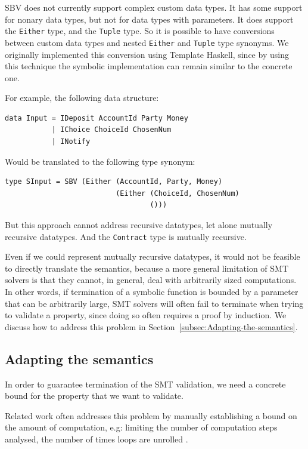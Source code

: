 \documentclass[english,runningheads]{llncs}
\begin{document}
SBV does not currently support complex custom data types. It has some
support for nonary data types, but not for data types with parameters.
It does support the \texttt{Either} type, and the \texttt{Tuple} type.
So it is possible to have conversions between custom data types and
nested \texttt{Either} and \texttt{Tuple} type synonyms. We originally
implemented this conversion using Template Haskell, since by using
this technique the symbolic implementation can remain similar to the
concrete one.

For example, the following data structure:

\begin{verbatim}
data Input = IDeposit AccountId Party Money
           | IChoice ChoiceId ChosenNum
           | INotify
\end{verbatim}

Would be translated to the following type synonym:

\begin{verbatim}
type SInput = SBV (Either (AccountId, Party, Money)
                          (Either (ChoiceId, ChosenNum)
                                  ()))
\end{verbatim}

But this approach cannot address recursive datatypes, let alone mutually
recursive datatypes. And the \texttt{Contract} type is mutually recursive.

Even if we could represent mutually recursive datatypes, it would
not be feasible to directly translate the semantics, because a more
general limitation of SMT solvers is that they cannot, in general,
deal with arbitrarily sized computations. In other words, if termination
of a symbolic function is bounded by a parameter that can be arbitrarily
large, SMT solvers will often fail to terminate when trying to validate
a property, since doing so often requires a proof by induction. We
discuss how to address this problem in Section~\ref{subsec:Adapting-the-semantics}.

\subsection{Adapting the semantics\label{subsec:Adapting-the-semantics}}

In order to guarantee termination of the SMT validation, we need a
concrete bound for the property that we want to validate.

Related work often addresses this problem by manually establishing
a bound on the amount of computation, e.g: limiting the number of
computation steps analysed, the number of times loops are unrolled
\cite{clarke2004tool,gulwani2008program,jackson2000finding}.
\end{document}
